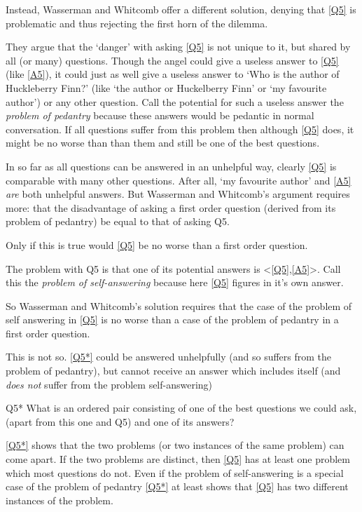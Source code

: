 Instead, Wasserman and Whitcomb offer a different solution, denying that \ref{Q5} is problematic and thus rejecting the first horn of the dilemma.

They argue that the `danger' with asking \ref{Q5} is not unique to it, but shared by all (or many) questions. 
Though the angel could give a useless answer to \ref{Q5} (like \ref{A5}), it could just as well give a useless answer to `Who is the author of Huckleberry Finn?' (like `the author or Huckelberry Finn' or `my favourite author') or any other question.
Call the potential for such a useless answer the \textit{problem of pedantry} because these answers would be pedantic in normal conversation.
If all questions suffer from this problem then although \ref{Q5} does, it might be no worse than than them and still be one of the best questions.

In so far as all questions can be answered in an unhelpful way, clearly \ref{Q5} is comparable with many other questions.
After all, `my favourite author' and \ref{A5} \emph{are} both unhelpful answers.
But Wasserman and Whitcomb's argument requires more: that the disadvantage of asking a first order question (derived from its problem of pedantry) be equal to that of asking Q5.

Only if this is true would \ref{Q5} be no worse than a first order question.

The problem with Q5 is that one of its potential answers is <\ref{Q5},\ref{A5}>.
Call this the \textit{problem of self-answering} because here \ref{Q5} figures in it's own answer.

So Wasserman and Whitcomb's solution requires that the case of the problem of self answering in \ref{Q5} is no worse than a case of the problem of pedantry in a first order question.

This is not so.
\ref{Q5*} could be answered unhelpfully (and so suffers from the problem of pedantry), but cannot receive an answer which includes itself (and \emph{does not} suffer from the problem self-answering)

	\begin{principle}{Q5*}\label{Q5*}
	What is an ordered pair consisting of one of the best questions we could ask, (apart from this one and Q5) and one of its answers?
	\end{principle}

\ref{Q5*} shows that the two problems (or two instances of the same problem) can come apart.
If the two problems are distinct, then \ref{Q5} has at least one problem which most questions do not.
Even if the problem of self-answering is a special case of the problem of pedantry \ref{Q5*} at least shows that \ref{Q5} has two different instances of the problem.

